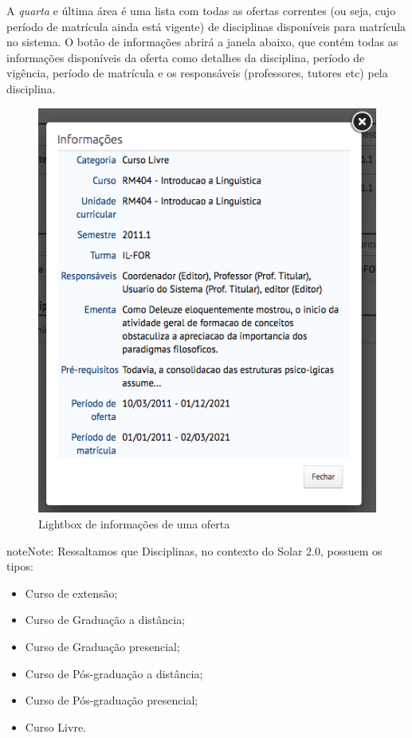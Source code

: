 \documentclass[letterpaper,10pt,english]{sphinxmanual}
\begin{document}
A \emph{quarta} e última área é uma lista com todas as ofertas correntes (ou seja, cujo período de matrícula ainda está vigente) de disciplinas disponíveis para matrícula no sistema. O botão de informações abrirá a janela abaixo, que contém todas as informações disponíveis da oferta como detalhes da disciplina, período de vigência, período de matrícula e os responsáveis (professores, tutores etc) pela disciplina.
\begin{figure}[htbp]
\centering
\capstart

\includegraphics{enrollment-lightbox.png}
\caption{Lightbox de informações de uma oferta}\end{figure}

\begin{notice}{note}{Note:}
Ressaltamos que Disciplinas, no contexto do Solar 2.0, possuem os tipos:
\begin{itemize}
\item {} 
Curso de extensão;

\item {} 
Curso de Graduação a distância;

\item {} 
Curso de Graduação presencial;

\item {} 
Curso de Pós-graduação a distância;

\item {} 
Curso de Pós-graduação presencial;

\item {} 
Curso Livre.

\end{itemize}
\end{notice}
\end{document}

